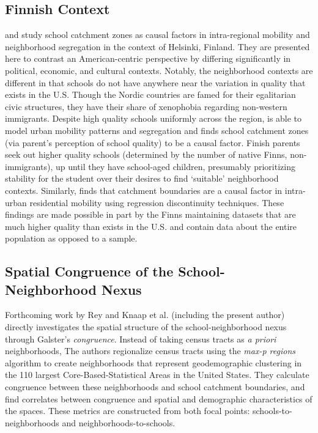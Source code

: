 \subsection{Finnish Context}

\cite{kauppinen2022UnderstandingEffects} and
\cite{bernelius2019PupilsMove} study school catchment zones as causal
factors in intra-regional mobility and neighborhood segregation in the
context of Helsinki, Finland. They are presented here to contrast an
American-centric perspective by differing significantly in political,
economic, and cultural contexts. Notably, the neighborhood contexts
are different in that schools do not have anywhere near the variation
in quality that exists in the U.S. Though the Nordic countries are
famed for their egalitarian civic structures, they have their share of
xenophobia regarding non-western immigrants. Despite high quality
schools uniformly across the region, \cite{bernelius2019PupilsMove} is
able to model urban mobility patterns and segregation and finds school
catchment zones (via parent's perception of school quality) to be a
causal factor. Finish parents seek out higher quality schools
(determined by the number of native Finns, non-immigrants), up until
they have school-aged children, presumably prioritizing stability for
the student over their desires to find `suitable' neighborhood
contexts. Similarly, \cite{kauppinen2022UnderstandingEffects} finds
that catchment boundaries are a causal factor in intra-urban
residential mobility using regression discontinuity techniques. These
findings are made possible in part by the Finns maintaining datasets
that are much higher quality than exists in the U.S. and contain data
about the entire population as opposed to a sample.

\subsection{Spatial Congruence of the School-Neighborhood Nexus}

Forthcoming work by Rey and Knaap et al. (including the present
author) directly investigates the spatial structure of the
school-neighborhood nexus through Galster's \emph{congruence}. Instead
of taking census tracts as \emph{a priori} neighborhoods, The authors
regionalize census tracts using the \emph{max-p regions} algorithm to
create neighborhoods that represent geodemographic clustering in the
110 largest Core-Based-Statistical Areas in the United States. They
calculate congruence between these neighborhoods and school catchment
boundaries, and find correlates between congruence and spatial and
demographic characteristics of the spaces. These metrics are
constructed from both focal points: schools-to-neighborhoods and
neighborhoods-to-schools.


